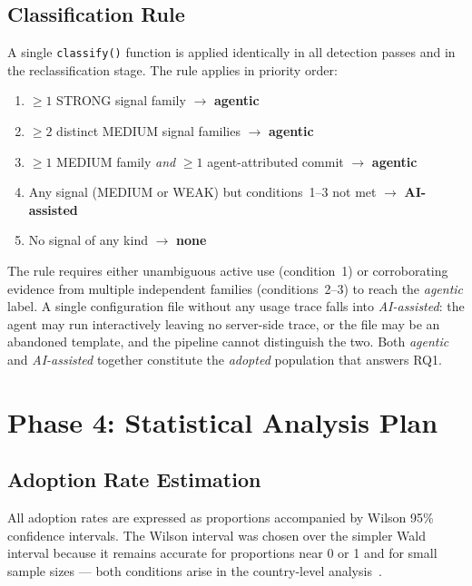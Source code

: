 \subsection{Classification Rule}

A single \texttt{classify()} function is applied identically in all detection passes and in the reclassification stage. The rule applies in priority order:

\begin{enumerate}
  \item $\geq 1$ STRONG signal family $\rightarrow$ \textbf{agentic}
  \item $\geq 2$ distinct MEDIUM signal families $\rightarrow$ \textbf{agentic}
  \item $\geq 1$ MEDIUM family \emph{and} $\geq 1$ agent-attributed commit $\rightarrow$ \textbf{agentic}
  \item Any signal (MEDIUM or WEAK) but conditions~1--3 not met $\rightarrow$ \textbf{AI-assisted}
  \item No signal of any kind $\rightarrow$ \textbf{none}
\end{enumerate}

The rule requires either unambiguous active use (condition~1) or corroborating evidence from multiple independent families (conditions~2--3) to reach the \emph{agentic} label. A single configuration file without any usage trace falls into \emph{AI-assisted}: the agent may run interactively leaving no server-side trace, or the file may be an abandoned template, and the pipeline cannot distinguish the two. Both \emph{agentic} and \emph{AI-assisted} together constitute the \emph{adopted} population that answers RQ1.

\section{Phase 4: Statistical Analysis Plan}
\label{sec:meth:statistics}

\subsection{Adoption Rate Estimation}

All adoption rates are expressed as proportions accompanied by Wilson 95\% confidence intervals. The Wilson interval was chosen over the simpler Wald interval because it remains accurate for proportions near 0 or 1 and for small sample sizes --- both conditions arise in the country-level analysis~\cite{barke2023}.

